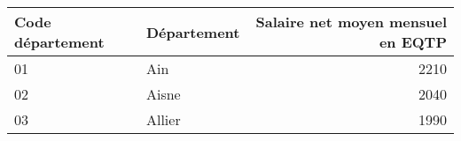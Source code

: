 \begin{tabular}{llr}
\toprule
\textbf{Code département} & \textbf{Département} &  \textbf{Salaire net moyen mensuel en EQTP} \\
\midrule
01               &         Ain &                               2210 \\
02               &       Aisne &                               2040 \\
03               &      Allier &                               1990 \\
\bottomrule
\end{tabular}
